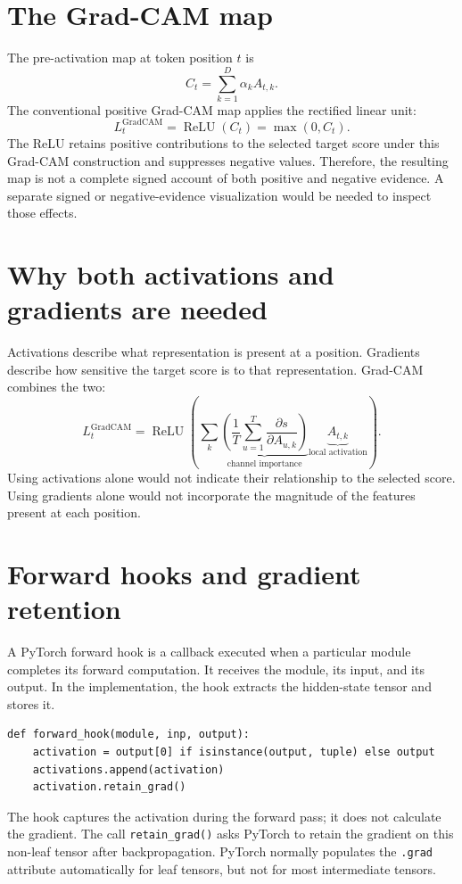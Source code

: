 \documentclass[11pt,a4paper]{article}
\begin{document}
\section{The Grad-CAM map}
The pre-activation map at token position $t$ is
\[
C_t=\sum_{k=1}^{D}\alpha_k A_{t,k}.
\]
The conventional positive Grad-CAM map applies the rectified linear unit:
\[
L_t^{\mathrm{GradCAM}}=
\operatorname{ReLU}(C_t)=\max(0,C_t).
\]
The ReLU retains positive contributions to the selected target score under this Grad-CAM construction and suppresses negative values. Therefore, the resulting map is not a complete signed account of both positive and negative evidence. A separate signed or negative-evidence visualization would be needed to inspect those effects.

\section{Why both activations and gradients are needed}
Activations describe what representation is present at a position. Gradients describe how sensitive the target score is to that representation. Grad-CAM combines the two:
\[
L_t^{\mathrm{GradCAM}}=
\operatorname{ReLU}\left(
\sum_k
\underbrace{\left(\frac{1}{T}\sum_{u=1}^{T}
\frac{\partial s}{\partial A_{u,k}}\right)}_{\text{channel importance}}
\underbrace{A_{t,k}}_{\text{local activation}}
\right).
\]
Using activations alone would not indicate their relationship to the selected score. Using gradients alone would not incorporate the magnitude of the features present at each position.

\section{Forward hooks and gradient retention}
A PyTorch forward hook is a callback executed when a particular module completes its forward computation. It receives the module, its input, and its output. In the implementation, the hook extracts the hidden-state tensor and stores it.

\begin{lstlisting}[style=python]
def forward_hook(module, inp, output):
    activation = output[0] if isinstance(output, tuple) else output
    activations.append(activation)
    activation.retain_grad()
\end{lstlisting}

The hook captures the activation during the forward pass; it does not calculate the gradient. The call \texttt{retain\_grad()} asks PyTorch to retain the gradient on this non-leaf tensor after backpropagation. PyTorch normally populates the \texttt{.grad} attribute automatically for leaf tensors, but not for most intermediate tensors.
\end{document}

